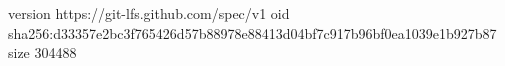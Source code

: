 version https://git-lfs.github.com/spec/v1
oid sha256:d33357e2bc3f765426d57b88978e88413d04bf7c917b96bf0ea1039e1b927b87
size 304488
